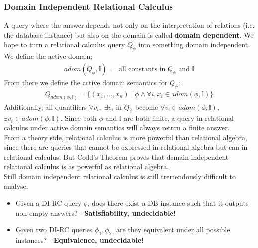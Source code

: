 \subsubsection{Domain Independent Relational Calculus}
A query where the answer depends not only on the interpretation of relations (i.e. the database instance) but also on the domain is called \textbf{domain dependent}. We hope to turn a relational calculus query $Q_\phi$ into something domain independent. We define the active domain;
\begin{align*}
adom(Q_\phi, \mathbb{I}) = \text{ all constants in } Q_\phi \text{ and } \mathbb{I}
\end{align*}
From there we define the active domain semantics for $Q_\phi$:
\begin{align*}
Q_{adom(\phi, \mathbb{I})} = \{ (x_1, ..., x_n) \mid \phi \land \forall i, x_i \in adom(\phi, \mathbb{I})\}
\end{align*}
Additionally, all quantifiers $\forall v_i,\; \exists v_i$ in $
Q_\phi$ become $\forall v_i \in adom(\phi, \mathbb{I})$, $\exists v_i \in adom(\phi, \mathbb{I})$. Since both $\phi$ and $\mathbb{I}$ are both finite, a query in relational calculus under active domain semantics will always return a finite answer.
\vspace{.2cm}\\
From a theory side, relational calculus is more powerful than relational algebra, since there are queries that cannot be expressed in relational algebra but can in relational calculus. But Codd's Theorem proves that domain-independent relational calculus is as powerful as relational algebra.\\
Still domain independent relational calculus is still tremendously difficult to analyse.
\begin{itemize}
\item Given a DI-RC query $\phi$, does there exist a DB instance such that it outputs non-empty answers? - \textbf{Satisfiability, undecidable!} 
\item Given two DI-RC queries $\phi_1, \phi_2$, are they equivalent under all possible instances? - \textbf{Equivalence, undecidable!}
\end{itemize}

